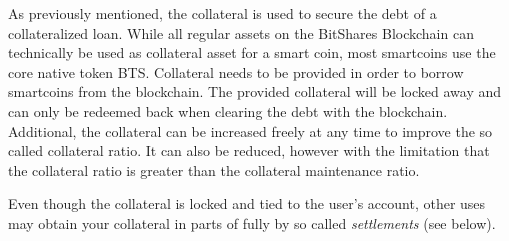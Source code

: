 \label{sec:collateral}

As previously mentioned, the collateral is used to secure the debt of a
collateralized loan.
 While all regular assets on the BitShares Blockchain can
technically be used as collateral asset for a smart coin, most smartcoins
use the core native token BTS.
Collateral needs to be provided in order to borrow smartcoins from the
blockchain. The provided collateral will be locked away and can only be
redeemed back when clearing the debt with the blockchain. 
Additional, the collateral can be increased freely at any time to improve the
so called collateral ratio. It can also be reduced, however with the limitation
that the collateral ratio is greater than the collateral maintenance ratio.

Even though the collateral is locked and tied to the user's account, other uses
may obtain your collateral in parts of fully by so called \emph{settlements}
(see below).

